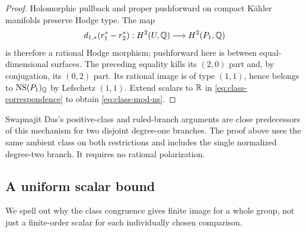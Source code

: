 \begin{proof}
Holomorphic pullback and proper pushforward on compact K\"ahler manifolds
preserve Hodge type.  The map
\[
 d_{1,*}(r_1^*-r_2^*):H^2(U,\mathbb Q)\longrightarrow H^2(P_1,\mathbb Q)
\]
is therefore a rational Hodge morphism; pushforward here is between
equal-dimensional surfaces.  The preceding equality kills its
\((2,0)\) part and, by conjugation, its \((0,2)\) part.  Its rational
image is of type \((1,1)\), hence belongs to \(\operatorname{NS}(P_1)_\mathbb Q\) by
Lefschetz \((1,1)\).  Extend scalars to \(\mathbb R\) in
\eqref{eq:class-correspondence} to obtain \eqref{eq:class-mod-ns}.
\end{proof}

Swapnajit Das's positive-class and ruled-branch arguments
\cite[Lemmas~7.2--7.3 and Corollary~7.4]{Das2026} are close predecessors
of this mechanism for two disjoint degree-one branches.  The proof above
uses the same ambient class on both restrictions and includes the single
normalized degree-two branch.  It requires no rational polarization.

\subsection{A uniform scalar bound}

We spell out why the class congruence gives finite image for a whole group,
not just a finite-order scalar for each individually chosen comparison.

